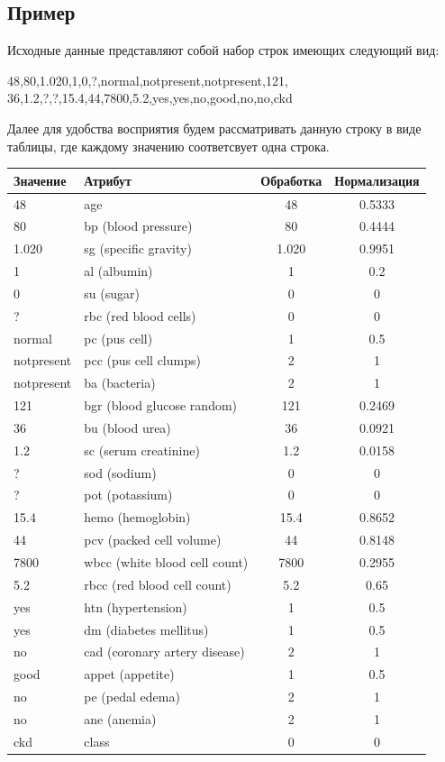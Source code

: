 \subsection {Пример}
Исходные данные представляют собой набор строк имеющих следующий вид:
\begin{center}
48,80,1.020,1,0,?,normal,notpresent,notpresent,121,
36,1.2,?,?,15.4,44,7800,5.2,yes,yes,no,good,no,no,ckd 
\end{center}
Далее для удобства восприятия будем рассматривать данную строку в виде таблицы, где каждому значению соответсвует одна строка.
\begin{table}[H]
\begin{tabular}{llcc}
\toprule
Значение  & Атрибут  & Обработка & Нормализация \\
\midrule 
48 & age & 48 & 0.5333  \\
80 & bp (blood pressure) & 80 & 0.4444  \\
1.020 & sg (specific gravity) & 1.020 & 0.9951  \\
1 & al (albumin) & 1 & 0.2  \\
0 & su (sugar) & 0 & 0  \\
? & rbc (red blood cells) & 0 & 0  \\
normal & pc (pus cell) & 1 & 0.5 \\
notpresent & pcc (pus cell clumps) & 2 & 1  \\
notpresent & ba (bacteria) & 2 & 1 \\
121 & bgr (blood glucose random) & 121 & 0.2469 \\
36 & bu (blood urea) & 36 & 0.0921  \\
1.2 & sc (serum creatinine) & 1.2 & 0.0158  \\
? & sod (sodium) & 0 &  0 \\
? & pot (potassium) & 0 & 0  \\
15.4 & hemo (hemoglobin) & 15.4 & 0.8652  \\
44 & pcv (packed cell volume) & 44 & 0.8148  \\
7800 & wbcc (white blood cell count) & 7800 & 0.2955  \\
5.2 & rbcc (red blood cell count) & 5.2 & 0.65  \\
yes & htn (hypertension) & 1 & 0.5  \\
yes & dm (diabetes mellitus) & 1 & 0.5  \\
no  & cad (coronary artery disease) & 2 & 1  \\
good & appet (appetite) & 1 & 0.5  \\
no & pe (pedal edema) & 2 & 1  \\
no & ane (anemia) & 2 & 1  \\
ckd & class & 0 & 0  \\
\bottomrule
\end{tabular}
\end{table}

